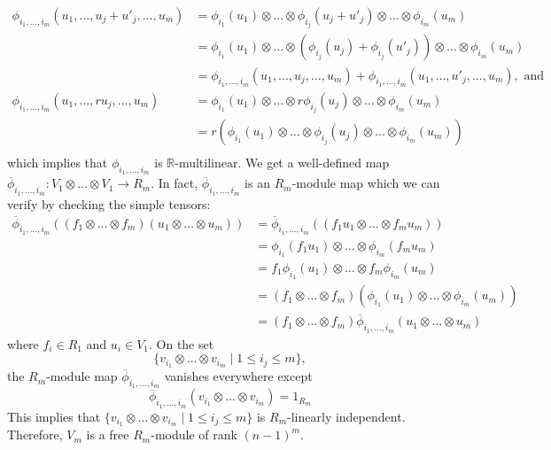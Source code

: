 \documentclass{amsart}
\makeatletter
\renewenvironment{proof}[1][\proofname]{%
   \par\pushQED{\qed}\normalfont%
   \topsep6\p@\@plus6\p@\relax
   \trivlist\item[\hskip\labelsep\bfseries#1\@addpunct{.}]%
   \ignorespaces
}{%
   \popQED\endtrivlist\@endpefalse
}
\makeatother
\begin{document}
\begin{proof}
    \begin{align*}
    \phi_{i_1,\dots,i_m}(u_1,\dots,u_j + u'_j,\dots,u_m) 
    &= \phi_{i_1}(u_1) \otimes \dots \otimes \phi_{i_j}(u_j + u'_j) \otimes \dots \otimes \phi_{i_m}(u_m) \\ 
    &= \phi_{i_1}(u_1) \otimes \dots \otimes (\phi_{i_j}(u_j) + \phi_{i_j}(u'_j)) \otimes \dots \otimes \phi_{i_m}(u_m) \\ 
    & = \phi_{i_1,\dots,i_m}(u_1,\dots,u_j,\dots,u_m) + \phi_{i_1,\dots,i_m}(u_1,\dots,u'_j,\dots,u_m), \text{ and } \\
    \phi_{i_1,\dots,i_m}(u_1,\dots,r u_j,\dots,u_m) 
    &= \phi_{i_1}(u_1) \otimes \dots \otimes r\phi_{i_j}(u_j) \otimes \dots \otimes \phi_{i_m}(u_m) \\   
    &= r(\phi_{i_1}(u_1) \otimes \dots \otimes \phi_{i_j}(u_j) \otimes \dots \otimes \phi_{i_m}(u_m)) \\
    \end{align*}
    which implies that $\phi_{i_1,\dots,i_m}$ is $\mathbb{R}$-multilinear.
    We get a well-defined map $\overline{\phi}_{i_1,\dots,i_m}:V_1 \otimes \dots \otimes V_1 \to R_m$. In fact, $\overline{\phi}_{i_1,\dots,i_m}$ is an $R_m$-module map which we can verify by checking the simple tensors:
    \begin{align*}
    \overline{\phi}_{i_1,\dots,i_m}((f_1\otimes \dots \otimes f_m)(u_1\otimes \dots \otimes u_m)) 
    &= \overline{\phi}_{i_1,\dots,i_m}((f_1u_1\otimes \dots \otimes f_mu_m)) \\
    &= \phi_{i_1}(f_1u_1)\otimes \dots \otimes \phi_{i_m}(f_mu_m) \\
    &= f_1\phi_{i_1}(u_1)\otimes \dots \otimes f_m\phi_{i_m}(u_m) \\
    &= (f_1\otimes \dots \otimes f_m)(\phi_{i_1}(u_1)\otimes \dots \otimes \phi_{i_m}(u_m)) \\
    &= (f_1\otimes \dots \otimes f_m)\overline{\phi}_{i_1,\dots,i_m}(u_1\otimes \dots \otimes u_m)
    \end{align*}
    where $f_i \in R_1$ and $u_i \in V_1$. On the set  
    \[
    \{ v_{i_1} \otimes \dots \otimes v_{i_m} \mid 1 \leq i_j \leq m \},
    \]
    the $R_m$-module map $\overline{\phi}_{i_1,\dots,i_m}$ vanishes everywhere except
    \[
    \overline{\phi}_{i_1,\dots,i_m}(v_{i_1} \otimes \dots \otimes v_{i_m}) = 1_{R_m}
    \]
    This implies that $\{ v_{i_1} \otimes \dots \otimes v_{i_m} \mid 1 \leq i_j \leq m \}$ is $R_m$-linearly independent. Therefore, $V_m$ is a free $R_m$-module of rank $(n-1)^m$.
\end{proof}
\end{document}
